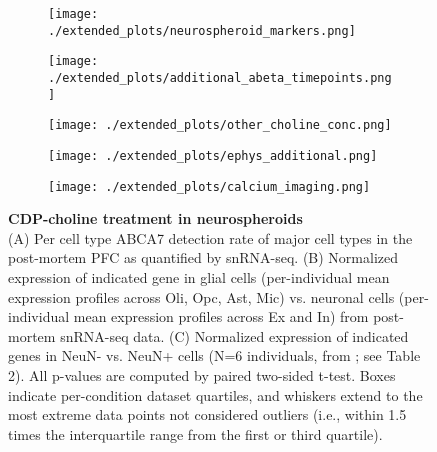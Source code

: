 \begin{figure}[ht]
    \begin{subfigure}[t]{\textwidth}
        \caption{}
        \texttt{[image: ./extended\_plots/neurospheroid\_markers.png]}        
    \end{subfigure}
    \begin{subfigure}[t]{0.2\textwidth}
        \caption{}
        \texttt{[image: ./extended\_plots/additional\_abeta\_timepoints.png]}        
    \end{subfigure}
    \begin{subfigure}[t]{0.2\textwidth}
        \caption{}
        \texttt{[image: ./extended\_plots/other\_choline\_conc.png]}        
    \end{subfigure}
    \begin{subfigure}[t]{0.2\textwidth}
        \caption{}
        \texttt{[image: ./extended\_plots/ephys\_additional.png]}        
    \end{subfigure}
    \begin{subfigure}[t]{0.2\textwidth}
        \caption{}
        \texttt{[image: ./extended\_plots/calcium\_imaging.png]}        
    \end{subfigure}
    \caption{
        \textbf{CDP-choline treatment in neurospheroids}\\[1ex]
        (A) Per cell type ABCA7 detection rate of major cell types in the post-mortem PFC as quantified by snRNA-seq. 
        (B) Normalized expression of indicated gene in glial cells (per-individual mean expression profiles across Oli, Opc, Ast, Mic) vs. neuronal cells (per-individual mean expression profiles across Ex and In) from post-mortem snRNA-seq data. 
        (C) Normalized expression of indicated genes in NeuN- vs. NeuN+ cells (N=6 individuals, from \cite{Welch2022-aa}; see Table 2). All p-values are computed by paired two-sided t-test. Boxes indicate per-condition dataset quartiles, and whiskers extend to the most extreme data points not considered outliers (i.e., within 1.5 times the interquartile range from the first or third quartile).
    }
    \label{fig:neurospheroid_figure}
\end{figure}
